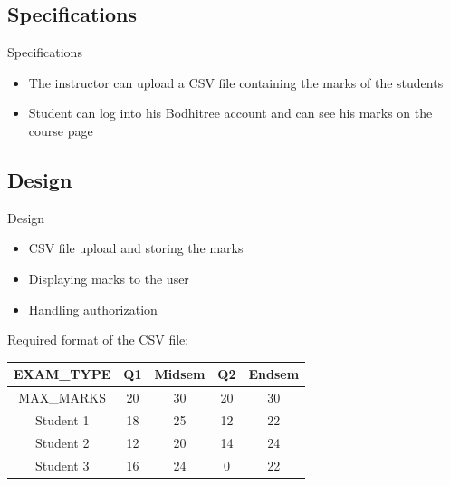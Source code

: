 \documentclass{beamer}
\begin{document}
\subsection{Specifications}

\begin{frame}{Specifications}
	\begin{itemize}
		\item The instructor can upload a CSV file containing the marks of the students
		\item Student can log into his Bodhitree account and can see his marks on the course page
	\end{itemize}
\end{frame}

\subsection{Design}

\begin{frame}{Design}
	\begin{itemize}
		\item CSV file upload and storing the marks
		\item Displaying marks to the user
		\item Handling authorization
	\end{itemize}
\end{frame}

\begin{frame}
	Required format of the CSV file: \\
	\vspace{0.4cm}
	\centering
	\begin{tabular}{|c|c|c|c|c|}
		\hline \rule[-2ex]{0pt}{5.5ex} EXAM\_TYPE & Q1 & Midsem & Q2 & Endsem \\ 
		\hline \rule[-2ex]{0pt}{5.5ex} MAX\_MARKS & 20 & 30 & 20 & 30 \\ 
		\hline \rule[-2ex]{0pt}{5.5ex} Student 1 & 18 & 25 & 12 & 22 \\ 
		\hline \rule[-2ex]{0pt}{5.5ex} Student 2 & 12 & 20 & 14 & 24 \\ 
		\hline \rule[-2ex]{0pt}{5.5ex} Student 3 & 16 & 24 & 0 & 22 \\ 
		\hline 
	\end{tabular} 
\end{frame}
\end{document}
